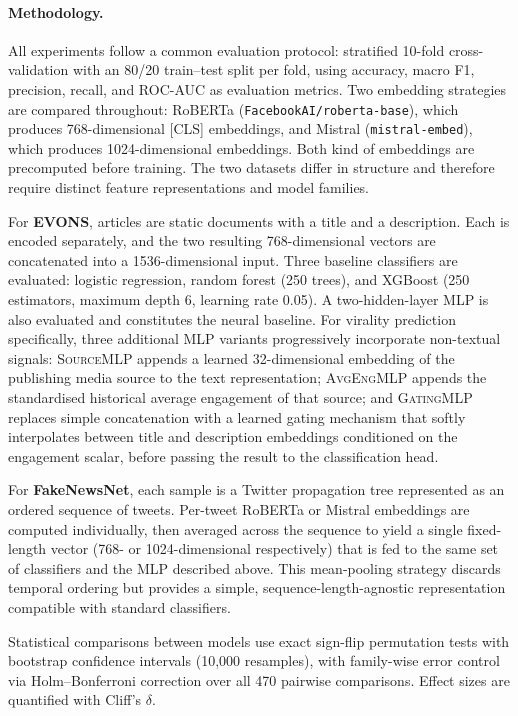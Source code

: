 
\paragraph{Methodology.}
All experiments follow a common evaluation protocol: stratified 10-fold cross-validation with an 80/20 train--test split per fold, using accuracy, macro F1, precision, recall, and ROC-AUC as evaluation metrics. Two embedding strategies are compared throughout: RoBERTa (\texttt{FacebookAI/roberta-base}), which produces 768-dimensional [CLS] embeddings, and Mistral (\texttt{mistral-embed}), which produces 1024-dimensional embeddings. Both kind of embeddings are precomputed before training. The two datasets differ in structure and therefore require distinct feature representations and model families.

For \textbf{EVONS}, articles are static documents with a title and a description. Each is encoded separately, and the two resulting 768-dimensional vectors are concatenated into a 1536-dimensional input. Three baseline classifiers are evaluated: logistic regression, random forest (250 trees), and XGBoost (250 estimators, maximum depth 6, learning rate 0.05). A two-hidden-layer MLP is also evaluated and constitutes the neural baseline. For virality prediction specifically, three additional MLP variants progressively incorporate non-textual signals: \textsc{SourceMLP} appends a learned 32-dimensional embedding of the publishing media source to the text representation; \textsc{AvgEngMLP} appends the standardised historical average engagement of that source; and \textsc{GatingMLP} replaces simple concatenation with a learned gating mechanism that softly interpolates between title and description embeddings conditioned on the engagement scalar, before passing the result to the classification head.

For \textbf{FakeNewsNet}, each sample is a Twitter propagation tree represented as an ordered sequence of tweets. Per-tweet RoBERTa or Mistral embeddings are computed individually, then averaged across the sequence to yield a single fixed-length vector (768- or 1024-dimensional respectively) that is fed to the same set of classifiers and the MLP described above. This mean-pooling strategy discards temporal ordering but provides a simple, sequence-length-agnostic representation compatible with standard classifiers.

Statistical comparisons between models use exact sign-flip permutation tests with bootstrap confidence intervals (10{,}000 resamples), with family-wise error control via Holm--Bonferroni correction over all 470 pairwise comparisons. Effect sizes are quantified with Cliff's $\delta$.